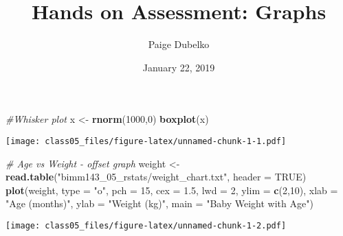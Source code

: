 \documentclass[]{article}
\title{Hands on Assessment: Graphs}
\author{Paige Dubelko}
\date{January 22, 2019}
\newenvironment{Shaded}{\begin{snugshade}}{\end{snugshade}}
\newcommand{\KeywordTok}[1]{\textcolor[rgb]{0.13,0.29,0.53}{\textbf{#1}}}
\newcommand{\DataTypeTok}[1]{\textcolor[rgb]{0.13,0.29,0.53}{#1}}
\newcommand{\DecValTok}[1]{\textcolor[rgb]{0.00,0.00,0.81}{#1}}
\newcommand{\FloatTok}[1]{\textcolor[rgb]{0.00,0.00,0.81}{#1}}
\newcommand{\CharTok}[1]{\textcolor[rgb]{0.31,0.60,0.02}{#1}}
\newcommand{\StringTok}[1]{\textcolor[rgb]{0.31,0.60,0.02}{#1}}
\newcommand{\CommentTok}[1]{\textcolor[rgb]{0.56,0.35,0.01}{\textit{#1}}}
\newcommand{\OtherTok}[1]{\textcolor[rgb]{0.56,0.35,0.01}{#1}}
\newcommand{\OperatorTok}[1]{\textcolor[rgb]{0.81,0.36,0.00}{\textbf{#1}}}
\newcommand{\NormalTok}[1]{#1}
\begin{document}
\maketitle

\begin{Shaded}
\begin{Highlighting}[]
\CommentTok{#Whisker plot}
\NormalTok{x <-}\StringTok{ }\KeywordTok{rnorm}\NormalTok{(}\DecValTok{1000}\NormalTok{,}\DecValTok{0}\NormalTok{)}
\KeywordTok{boxplot}\NormalTok{(x)}
\end{Highlighting}
\end{Shaded}

\texttt{[image: class05\_files/figure-latex/unnamed-chunk-1-1.pdf]}

\begin{Shaded}
\begin{Highlighting}[]
\CommentTok{# Age vs Weight - offset graph}
\NormalTok{weight <-}\StringTok{ }\KeywordTok{read.table}\NormalTok{(}\StringTok{"bimm143_05_rstats/weight_chart.txt"}\NormalTok{, }\DataTypeTok{header =} \OtherTok{TRUE}\NormalTok{)}
\KeywordTok{plot}\NormalTok{(weight, }\DataTypeTok{type =} \StringTok{"o"}\NormalTok{, }\DataTypeTok{pch =} \DecValTok{15}\NormalTok{, }\DataTypeTok{cex =} \FloatTok{1.5}\NormalTok{, }\DataTypeTok{lwd =} \DecValTok{2}\NormalTok{, }\DataTypeTok{ylim =} \KeywordTok{c}\NormalTok{(}\DecValTok{2}\NormalTok{,}\DecValTok{10}\NormalTok{),}
     \DataTypeTok{xlab =} \StringTok{"Age (months)"}\NormalTok{, }\DataTypeTok{ylab =} \StringTok{"Weight (kg)"}\NormalTok{,}
     \DataTypeTok{main =} \StringTok{"Baby Weight with Age"}\NormalTok{)}
\end{Highlighting}
\end{Shaded}

\texttt{[image: class05\_files/figure-latex/unnamed-chunk-1-2.pdf]}

\begin{Shaded}
\end{Shaded}
\end{document}
